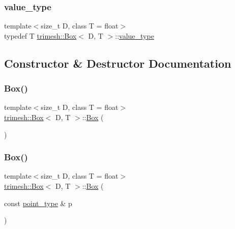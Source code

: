 \subsubsection{\texorpdfstring{value\+\_\+type}{value\_type}}
{\footnotesize\ttfamily template$<$size\+\_\+t D, class T = float$>$ \\
typedef T \hyperlink{classtrimesh_1_1Box}{trimesh\+::\+Box}$<$ D, T $>$\+::\hyperlink{classtrimesh_1_1Box_aa78431130c7bda4a326f3a23da88ba82}{value\+\_\+type}}



\subsection{Constructor \& Destructor Documentation}
\mbox{\label{classtrimesh_1_1Box_af7a91b84e4bcb2dabc6b94ef2a2872a1}} 
\subsubsection{\texorpdfstring{Box()}{Box()}\hspace{0.1cm}{\footnotesize\ttfamily [1/3]}}
{\footnotesize\ttfamily template$<$size\+\_\+t D, class T = float$>$ \\
\hyperlink{classtrimesh_1_1Box}{trimesh\+::\+Box}$<$ D, T $>$\+::\hyperlink{classtrimesh_1_1Box}{Box} (\begin{DoxyParamCaption}{ }\end{DoxyParamCaption})\hspace{0.3cm}{\ttfamily [inline]}}

\mbox{\label{classtrimesh_1_1Box_ac89db794c58d514ace2230361499352f}} 
\subsubsection{\texorpdfstring{Box()}{Box()}\hspace{0.1cm}{\footnotesize\ttfamily [2/3]}}
{\footnotesize\ttfamily template$<$size\+\_\+t D, class T = float$>$ \\
\hyperlink{classtrimesh_1_1Box}{trimesh\+::\+Box}$<$ D, T $>$\+::\hyperlink{classtrimesh_1_1Box}{Box} (\begin{DoxyParamCaption}\item[{const \hyperlink{classtrimesh_1_1Box_a208c806781f96a7001491a275dfa7655}{point\+\_\+type} \&}]{p }\end{DoxyParamCaption})\hspace{0.3cm}{\ttfamily [inline]}}

